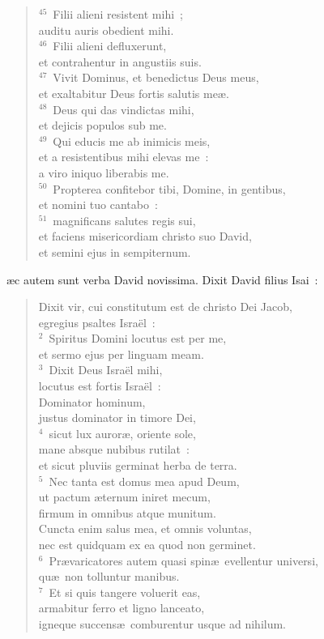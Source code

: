 \begin{verse}
${}^{45}$~Filii alieni resistent mihi~;\\ auditu auris obedient mihi.\\
${}^{46}$~Filii alieni defluxerunt,\\ et contrahentur in angustiis suis.\\
${}^{47}$~Vivit Dominus, et benedictus Deus meus,\\ et exaltabitur Deus fortis salutis me\ae .\\
${}^{48}$~Deus qui das vindictas mihi,\\ et dejicis populos sub me.\\
${}^{49}$~Qui educis me ab inimicis meis,\\ et a resistentibus mihi elevas me~:\\ a viro iniquo liberabis me.\\
${}^{50}$~Propterea confitebor tibi, Domine, in gentibus,\\ et nomini tuo cantabo~:\\
${}^{51}$~magnificans salutes regis sui,\\ et faciens misericordiam christo suo David,\\ et semini ejus in sempiternum.\end{verse}



\bchapter
{}\ae c autem sunt verba David novissima. Dixit David filius Isai~: \begin{verse}\vspace{6pt}Dixit vir, cui constitutum est de christo Dei Jacob,\\ egregius psaltes Isra\"el~:\\
${}^{2}$~Spiritus Domini locutus est per me,\\ et sermo ejus per linguam meam.\\
${}^{3}$~Dixit Deus Isra\"el mihi,\\ locutus est fortis Isra\"el~:\\ Dominator hominum,\\ justus dominator in timore Dei,\\
${}^{4}$~sicut lux auror\ae , oriente sole,\\ mane absque nubibus rutilat~:\\ et sicut pluviis germinat herba de terra.\\
${}^{5}$~Nec tanta est domus mea apud Deum,\\ ut pactum \ae ternum iniret mecum,\\ firmum in omnibus atque munitum.\\ Cuncta enim salus mea, et omnis voluntas,\\ nec est quidquam ex ea quod non germinet.\\
${}^{6}$~Pr\ae varicatores autem quasi spin\ae\ evellentur universi,\\ qu\ae\ non tolluntur manibus.\\
${}^{7}$~Et si quis tangere voluerit eas,\\ armabitur ferro et ligno lanceato,\\ igneque succens\ae\ comburentur usque ad nihilum.\end{verse}



